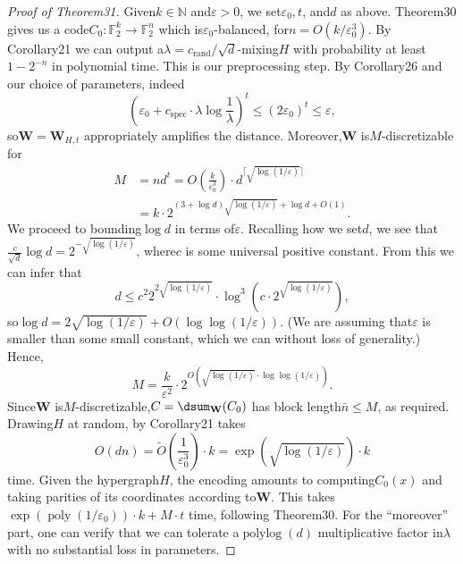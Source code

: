 \begin{proof}[Proof of Theorem31]
Given$k\in\mathbb N$ and$\varepsilon>0$, we set$\varepsilon_0,t$, and$d$ as above. Theorem30 gives us a code$C_0:\mathbb F_2^k\to\mathbb F_2^n$ which is$\varepsilon_0$-balanced, for$n=O(k/\varepsilon_0^3)$. By Corollary21 we can output a$\lambda=c_{\mathrm{rand}}/\sqrt d$-mixing$H$ with probability at least$1-2^{-n}$ in polynomial time. This is our preprocessing step. By Corollary26 and our choice of parameters, indeed
\[\left(\varepsilon_0+c_{\mathrm{spec}}\cdot\lambda\log\frac1\lambda\right)^t\leq(2\varepsilon_0)^t\leq\varepsilon,\]
so$\mathbf W=\mathbf W_{H,t}$ appropriately amplifies the distance. Moreover,$\mathbf W$ is$M$-discretizable for
\begin{align*}
M&=nd^t=O\left(\frac k{\varepsilon_0^3}\right)\cdot d^{\lceil\sqrt{\log(1/\varepsilon)}\rceil}\\
&=k\cdot2^{(3+\log d)\sqrt{\log(1/\varepsilon)}+\log d+O(1)}.
\end{align*}
We proceed to bounding$\log d$ in terms of$\varepsilon$. Recalling how we set$d$, we see that$\frac c{\sqrt d}\log d=2^{-\sqrt{\log(1/\varepsilon)}}$, where$c$ is some universal positive constant. From this we can infer that
\[d\leq c^2 2^{2\sqrt{\log(1/\varepsilon)}}\cdot\log^3\left(c\cdot2^{\sqrt{\log(1/\varepsilon)}}\right),\tag{7}\]
so$\log d=2\sqrt{\log(1/\varepsilon)}+O(\log\log(1/\varepsilon))$. (We are assuming that$\varepsilon$ is smaller than some small constant, which we can without loss of generality.) Hence,
\[M=\frac k{\varepsilon^2}\cdot2^{O(\sqrt{\log(1/\varepsilon)}\cdot\log\log(1/\varepsilon))}.\]
Since$\mathbf W$ is$M$-discretizable,$C=\dsum_{\mathbf W}(C_0)$ has block length$\bar n\leq M$, as required. Drawing$H$ at random, by Corollary21 takes
\[O(dn)=\widetilde O\left(\frac1{\varepsilon_0^3}\right)\cdot k=\exp(\sqrt{\log(1/\varepsilon)})\cdot k\]
time. Given the hypergraph$H$, the encoding amounts to computing$C_0(x)$ and taking parities of its coordinates according to$\mathbf W$. This takes$\exp(\operatorname{poly}(1/\varepsilon_0))\cdot k+M\cdot t$ time, following Theorem30.
For the ``moreover'' part, one can verify that we can tolerate a$\operatorname{polylog}(d)$ multiplicative factor in$\lambda$ with no substantial loss in parameters.
\end{proof}
